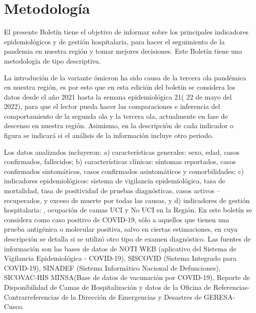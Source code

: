 \documentclass[12pt,a4paper,openany]{book}
\begin{document}
	
		
	
	\clearpage	
	\section*{Metodología}
	
	
	
	\noindent El presente Boletín tiene el objetivo de informar sobre los principales indicadores epidemiológicos y
	de gestión hospitalaria, para hacer el seguimiento de la pandemia en nuestra región y tomar mejores decisiones. Este Boletín tiene una metodología de tipo descriptiva.
	
	
	La introdución de la variante ómicron ha sido causa de la tercera ola pandémica en nuestra
	región, es por esto que en esta edición del boletín se considera los datos desde el año 2021 hasta la
	semana epidemiológica  21( 22 de mayo del 2022), para que el lector pueda hacer las comparaciones
	e inferencia del comportamiento de la segunda ola y la tercera ola, actualmente en fase de descenso
	en nuestra región. Asimismo, en la descripción de cada indicador o figura se indicará si el análisis de
	la información incluye otro periodo.
	
	
	Los datos analizados incluyeron: a) características generales: sexo, edad, casos confirmados,
	fallecidos; b) características clínicas: síntomas reportados, casos confirmados sintomáticos, casos
	confirmados asintomáticos y comorbilidades; c) indicadores epidemiológicos: sistema de vigilancia
	epidemiológica, tasa de mortalidad, tasa de positividad de pruebas diagnósticas, casos activos –
	recuperados, y exceso de muerte por todas las causas, y d) indicadores de gestión hospitalaria: ,
	ocupación de camas UCI y No UCI en la Región. En este boletín se considera como caso positivo de
	COVID-19, sólo a aquellos que tienen una prueba antigénica o molecular positiva, salvo en ciertas
	estimaciones, en cuya descripción se detalla si se utilizó otro tipo de examen diagnóstico.
	Las fuentes de información son las bases de datos de NOTI WEB (aplicativo del Sistema de
	Vigilancia Epidemiológica - COVID-19), SISCOVID (Sistema Integrado para COVID-19), SINADEF
	(Sistema Informático Nacional de Defunciones), SICOVAC-HIS MINSA(Base de datos de vacunación
	por COVID-19), Reporte de Disponibilidad de Camas de Hospitalización y datos de la Oficina de
	Referencias-Contrarreferencias de la Dirección de Emergencias y Desastres de GERESA-Cusco.
	
\end{document}
